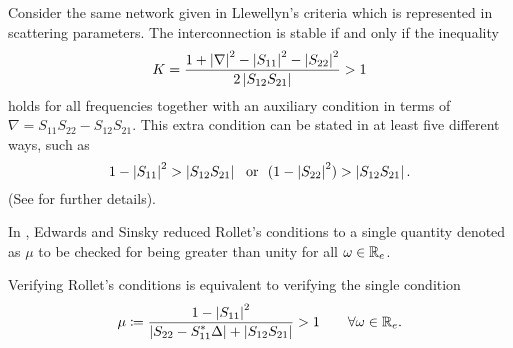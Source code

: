 \begin{thm} Consider the same network given in Llewellyn's criteria which is represented in scattering parameters.
The interconnection is stable if and only if the inequality 
\begin{equation}
K = \frac{1+\displaystyle \left|\nabla\right|^2-\displaystyle \left|S_{11}\right|^2-\displaystyle \left|S_{22}\right|^2}{2\displaystyle \left|S_{12}S_{21}\right|} > 1
\end{equation}
holds for all frequencies together with an auxiliary condition in terms of $\nabla = S_{11}S_{22}-
S_{12}S_{21}$. This extra condition can be stated in at least five different ways, such as 
\[ 
1-\displaystyle \left|S_{11}\right|^2 > \displaystyle \left|S_{12}S_{21}\right|\ \text{ or } \ (1-\displaystyle \left|S_{22}\right|^2)> \displaystyle \left|S_{12}S_{21}\right|. 
\] 
(See \cite{edsin} for further details). 
\end{thm}

In \cite{edsin}, Edwards and Sinsky reduced Rollet's conditions to a single quantity denoted as $\mu$ to be checked 
for being greater than unity for all $\omega\in\mathbb{R}_e$. 
 \begin{thm} Verifying Rollet's conditions is equivalent to verifying the single condition
\[
\mu\coloneqq \frac{1-\displaystyle \left|S_{11}\right|^2}{\displaystyle \left|S_{22}-S_{11}^*\Delta\right|+\displaystyle \left|S_{12}S_{21}\right|} > 1\qquad \forall \omega\in\mathbb{R}_e.
\]
\end{thm}
